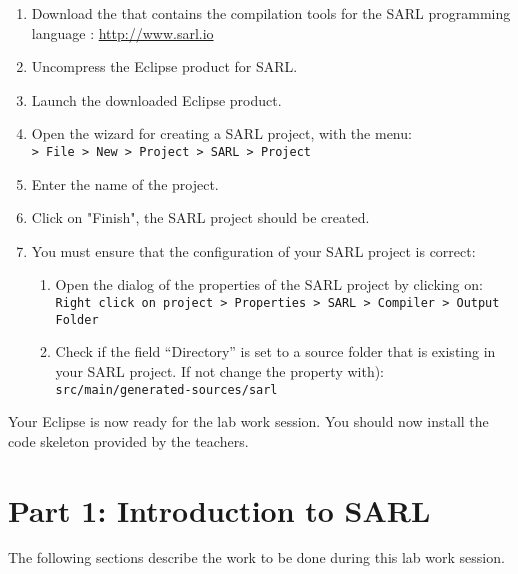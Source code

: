 \documentclass[article,english,nodocumentinfo]{multiagentfrreport}
\begin{document}
\begin{enumerate}
\item Download the  that contains the compilation tools for the SARL programming language : \url{http://www.sarl.io}
\item Uncompress the Eclipse product for SARL.
\item Launch the downloaded Eclipse product.
\item Open the wizard for creating a SARL project, with the menu: \\
	\texttt{> File > New > Project > SARL > Project}
\item Enter the name of the project.
\item Click on "Finish", the SARL project should be created.
\item You must ensure that the configuration of your SARL project is correct:
	\begin{enumerate}[a]
	\item Open the dialog of the properties of the SARL project by clicking on: \\
		\texttt{Right click on project > Properties > SARL > Compiler > Output Folder}
	\item Check if the field ``Directory'' is set to a source folder that is existing in your SARL project. If not change the property with): \\
		\texttt{src/main/generated-sources/sarl}
	\end{enumerate}
\end{enumerate}

Your Eclipse is now ready for the lab work session. You should now install the code skeleton provided by the teachers.

\section{Part 1: Introduction to SARL}

The following sections describe the work to be done during this lab work session.
\end{document}
